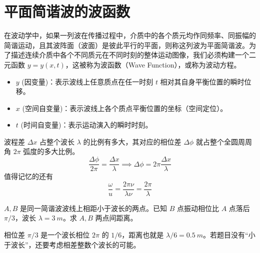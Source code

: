 \documentclass[lang=cn,11pt]{elegantbook}
\begin{document}
\section{平面简谐波的波函数}
在波动学中，如果一列波在传播过程中，介质中的各个质元均作同频率、同振幅的简谐运动，且其波阵面（波面）是彼此平行的平面，则称这列波为平面简谐波。为了描述连续介质中各个不同质元在不同时刻的整体运动图像，我们必须构建一个二元函数 $y = y(x,t)$，这被称为波函数（Wave Function），或称为波动方程。
\begin{itemize}
\item $y$ (因变量)：表示波线上任意质点在任一时刻 $t$ 相对其自身平衡位置的瞬时位移。
\item $x$ (空间自变量)：表示波线上各个质点平衡位置的坐标（空间定位）。
\item $t$ (时间自变量)：表示运动演入的瞬时时刻。
\end{itemize}

\begin{theorem}[相位差与波程差转换公式]
波程差 $\Delta x$ 占整个波长 $\lambda$ 的比例有多大，其对应的相位差 $\Delta \phi$ 就占整个全圆周周角 $2\pi$ 弧度的多大比例。$$\frac{\Delta \phi}{2\pi}=\frac{\Delta x}{\lambda}\implies\boxed{\Delta \phi = 2\pi \frac{\Delta x}{\lambda}}$$值得记忆的还有$$\frac{\omega}{u} = \frac{2\pi \nu}{\lambda \nu} = \frac{2\pi}{\lambda}$$
\end{theorem}

\begin{exercise}
\(A,B\) 是同一简谐波波线上相距小于波长的两点。已知 \(B\) 点振动相位比 \(A\) 点落后 \(\pi/3\)，波长 \(\lambda=\SI{3}{m}\)。求 \(A,B\) 两点间距离。
\end{exercise}

\begin{solution}
相位差 \(\pi/3\) 是一个波长相位 \(2\pi\) 的 \(1/6\)，距离也就是 \(\lambda/6=\SI{0.5}{m}\)。若题目没有“小于波长”，还要考虑相差整数个波长的可能。
\end{solution}
\end{document}
